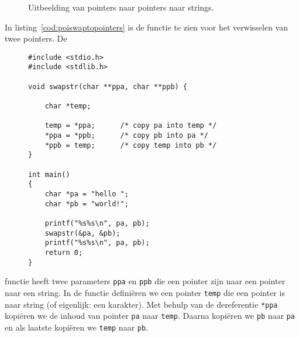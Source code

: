 \begin{figure}[!ht]
\centering
{}
\caption{Uitbeelding van pointers naar pointers naar strings.}
\label{fig:poipointertopointerstring}
\end{figure}

In listing~\ref{cod:poiswaptopointers} is de functie te zien voor het verwisselen van twee pointers. De 
\begin{figure}[!b]
\begin{lstlisting}[caption=Functie voor het verwisselen van twee pointers.,label=cod:poiswaptopointers]
#include <stdio.h>
#include <stdlib.h>

void swapstr(char **ppa, char **ppb) {

	char *temp;

    temp = *ppa;      /* copy pa into temp */
    *ppa = *ppb;      /* copy pb into pa */
    *ppb = temp;      /* copy temp into pb */
}

int main()
{
    char *pa = "hello ";
    char *pb = "world!";

    printf("%s%s\n", pa, pb);
    swapstr(&pa, &pb);
    printf("%s%s\n", pa, pb);
    return 0;
}
\end{lstlisting}
\end{figure}
functie heeft twee parameters \texttt{ppa} en \texttt{ppb} die een pointer zijn naar een pointer naar een string. In de functie definiëren we een pointer \texttt{temp} die een pointer is naar string (of eigenlijk: een karakter). Met behulp van de dereferentie \texttt{*ppa} kopiëren we de inhoud van pointer \texttt{pa} naar \texttt{temp}. Daarna kopiëren we \texttt{pb} naar \texttt{pa} en als laatste kopiëren we \texttt{temp} naar \texttt{pb}.

